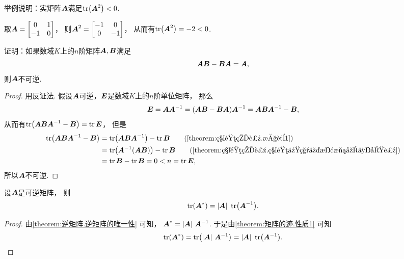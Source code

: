 \begin{example}
举例说明：实矩阵\(\boldsymbol{A}\)满足\(\tr(\boldsymbol{A}^2)<0\).
\begin{solution}
取\(\boldsymbol{A} = \begin{bmatrix}
	0 & 1 \\
	-1 & 0
\end{bmatrix}\)，
则\(\boldsymbol{A}^2 = \begin{bmatrix}
	-1 & 0 \\
	0 & -1
\end{bmatrix}\)，
从而有\(\tr(\boldsymbol{A}^2) = -2 < 0\).
\end{solution}
\end{example}

\begin{example}
证明：如果数域\(K\)上的\(n\)阶矩阵\(\boldsymbol{A},\boldsymbol{B}\)满足\[
	\boldsymbol{A} \boldsymbol{B} - \boldsymbol{B} \boldsymbol{A}=\boldsymbol{A},
\]
则\(\boldsymbol{A}\)不可逆.
\begin{proof}
用反证法.
假设\(\boldsymbol{A}\)可逆，\(\boldsymbol{E}\)是数域\(K\)上的\(n\)阶单位矩阵，
那么\begin{gather*}
	\vb{E} = \vb{A}\vb{A}^{-1}
	= (\vb{A} \vb{B} - \vb{B} \vb{A})\vb{A}^{-1} %
	= \vb{A} \vb{B} \vb{A}^{-1}-\vb{B},
\end{gather*}
从而有\(\tr(\boldsymbol{A} \boldsymbol{B} \boldsymbol{A}^{-1}-\boldsymbol{B}) = \tr\boldsymbol{E}\)，
但是\begin{align*}
	\tr(\vb{A} \vb{B} \vb{A}^{-1}-\vb{B})
	&= \tr(\vb{A} \vb{B} \vb{A}^{-1})-\tr\vb{B}
		\tag{\cref{theorem:矩阵的迹.性质1}} \\
	&= \tr(\vb{A}^{-1}(\vb{A} \vb{B}))-\tr\vb{B}
		\tag{\cref{theorem:矩阵的迹.矩阵乘积交换次序不变迹}} \\
	&= \tr\vb{B}-\tr\vb{B}
	= 0
	< n = \tr\vb{E},
\end{align*}
所以\(\boldsymbol{A}\)不可逆.
\end{proof}
\end{example}

\begin{property}
设\(\boldsymbol{A}\)是可逆矩阵，
则\begin{equation}
	\tr(\boldsymbol{A}^*) = \abs{\boldsymbol{A}}~\tr(\boldsymbol{A}^{-1}).
\end{equation}
\begin{proof}
由\cref{theorem:逆矩阵.逆矩阵的唯一性} 可知，
\(\boldsymbol{A}^* = \abs{\boldsymbol{A}}~\boldsymbol{A}^{-1}\).
于是由\cref{theorem:矩阵的迹.性质1} 可知\[
	\tr(\boldsymbol{A}^*) = \tr(\abs{\boldsymbol{A}}~\boldsymbol{A}^{-1}) = \abs{\boldsymbol{A}}~\tr(\boldsymbol{A}^{-1}).
	\qedhere
\]
\end{proof}
\end{property}

